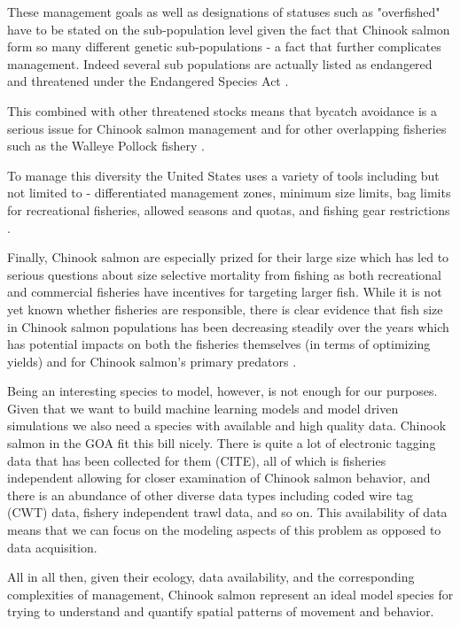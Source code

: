 \documentclass[11pt]{article}
\begin{document}
These management goals as well as designations of statuses such as "overfished" have to be stated on the sub-population level given the fact that Chinook salmon form so many different genetic sub-populations \citep{salmonplan} - a fact that further complicates management. Indeed several sub populations are actually listed as endangered and threatened under the Endangered Species Act \citep{NOAA24}.

This combined with other threatened stocks \citep{NOAA24} means that bycatch avoidance is a serious issue for Chinook salmon management and for other overlapping fisheries such as the Walleye Pollock fishery \citep{ianelli2015}. 

To manage this diversity the United States uses a variety of tools including but not limited to - differentiated management zones, minimum size limits, bag limits for recreational fisheries, allowed seasons and quotas, and fishing gear restrictions \citep{salmonplan}. \newline

Finally, Chinook salmon are especially prized for their large size which has led to serious questions about size selective mortality from fishing as both recreational and commercial fisheries have incentives for targeting larger fish. While it is not yet known whether fisheries are responsible, there is clear evidence that fish size in Chinook salmon populations has been decreasing steadily over the years which has potential impacts on both the fisheries themselves (in terms of optimizing yields) and for Chinook salmon's primary predators \citep{kendall2011}\citep{oceanchinook}. \newline

Being an interesting species to model, however, is not enough for our purposes. Given that we want to build machine learning models and model driven simulations we also need a species with available and high quality data. Chinook salmon in the GOA fit this bill nicely. There is quite a lot of electronic tagging data that has been collected for them (CITE), all of which is fisheries independent allowing for closer examination of Chinook salmon behavior, and there is an abundance of other diverse data types including coded wire tag (CWT) data, fishery independent trawl data, and so on. This availability of data means that we can focus on the modeling aspects of this problem as opposed to data acquisition. \newline


All in all then, given their ecology, data availability, and the corresponding complexities of management, Chinook salmon represent an ideal model species for trying to understand and quantify spatial patterns of movement and behavior. 
\end{document}
